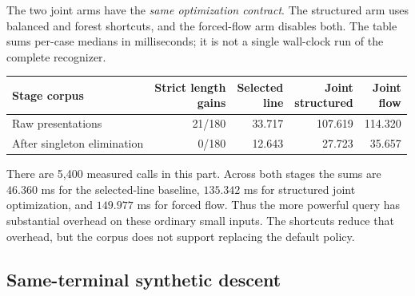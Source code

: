 \documentclass[11pt,letterpaper]{article}
\theoremstyle{definition}
\theoremstyle{remark}\newtheorem{remark}[theorem]{Remark}
\begin{document}
The two joint arms have the \emph{same optimization contract}. The structured
arm uses balanced and forest shortcuts, and the forced-flow arm disables
both. The table sums per-case medians in milliseconds; it is not a single
wall-clock run of the complete recognizer.
\begin{center}
\small
\begin{tabular}{@{}lrrrr@{}}
\toprule
Stage corpus & \shortstack{Strict length\\gains} & \shortstack{Selected\\line} & \shortstack{Joint\\structured} & \shortstack{Joint\\flow}\\
\midrule
Raw presentations & 21/180 & 33.717 & 107.619 & 114.320\\
After singleton elimination & 0/180 & 12.643 & 27.723 & 35.657\\
\bottomrule
\end{tabular}
\end{center}
There are 5,400 measured calls in this part. Across both stages the sums are
$46.360$ ms for the selected-line baseline, $135.342$ ms for structured joint
optimization, and $149.977$ ms for forced flow. Thus the more powerful query
has substantial overhead on these ordinary small inputs. The shortcuts reduce
that overhead, but the corpus does not support replacing the default policy.

\subsection{Same-terminal synthetic descent}
\end{document}

